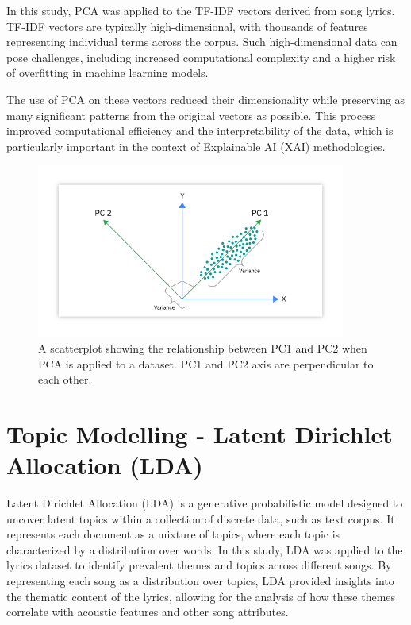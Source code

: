 In this study, PCA was applied to the TF-IDF vectors derived from song lyrics.
TF-IDF vectors are typically high-dimensional, with thousands of features
representing individual terms across the corpus. Such high-dimensional data can
pose challenges, including increased computational complexity and a higher risk
of overfitting in machine learning models.

The use of PCA on these vectors reduced their dimensionality while preserving
as many significant patterns from the original vectors as possible. This
process improved computational efficiency and the interpretability of the data,
which is particularly important in the context of Explainable AI (XAI)
methodologies.

\begin{center}
\begin{figure}[H]
  \centering
  \includegraphics[width=4in]{img/pca.png}
  \caption{A scatterplot showing the relationship between PC1 and PC2 when PCA
  is applied to a dataset. PC1 and PC2 axis are perpendicular to each other.\cite{pca}}
  \label{Figure:fig_beh}
\end{figure}
\end{center}


\section{Topic Modelling - Latent Dirichlet Allocation (LDA)}
\label{sec:topicmodelling}

Latent Dirichlet Allocation (LDA)\cite{lda} is a generative probabilistic model
designed to uncover latent topics within a collection of discrete data, such as
text corpus.  It represents each document as a mixture of topics, where each
topic is characterized by a distribution over words. In this study, LDA was
applied to the lyrics dataset to identify prevalent themes and topics across
different songs. By representing each song as a distribution over topics, LDA
provided insights into the thematic content of the lyrics, allowing for the
analysis of how these themes correlate with acoustic features and other song
attributes.

